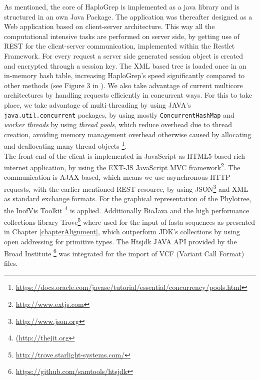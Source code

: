 As mentioned, the core of HaploGrep is implemented as a java library and is structured in an own Java Package. The application was thereafter designed as a Web application based on client-server architecture. This way all the computational intensive tasks are performed on server side, by getting use of REST for the client-server communication, implemented within the Restlet Framework. For every request a server side generated session object is created and encrypted through a session key. The XML based tree is loaded once in an in-memory hash table, increasing HaploGrep's speed significantly compared to other methods (see Figure 3 in \cite{Kloss-Brandstatter2011}). We also take advantage of current multicore architectures by handling requests efficiently in concurrent ways. For this to take place, we take advantage of multi-threading by using JAVA's \verb|java.util.concurrent| packages, by using mostly \verb|ConcurrentHashMap| and \textit{worker threads} by using \textit{thread pools}, which reduce overhead due to thread creation, avoiding memory management overhead otherwise caused by allocating and deallocating many thread objects \footnote{\url{https://docs.oracle.com/javase/tutorial/essential/concurrency/pools.html}}. \\
The front-end of the client is implemented in JavaScript as HTML5-based rich internet application, by using the EXT-JS JavaScript MVC framework\footnote{\url{http://www.extjs.com}}. The communication is AJAX based, which means we use asynchronous HTTP requests, with the earlier mentioned REST-resource, by using JSON\footnote{\url{http://www.json.org}} and XML as standard exchange formats. For the graphical representation of the Phylotree, the InofVis Toolkit \footnote{\url{(http://thejit.org}} is applied. Additionally BioJava \cite{Prlic2012} and the high performance collections library Trove\footnote{\url{http://trove.starlight-systems.com/}} where used for the input of fasta sequences as presented in Chapter \ref{chapterAlignment}, which outperform JDK's collections by using open addressing for primitive types. The Htsjdk JAVA API provided by the Broad Institute \footnote{\url{https://github.com/samtools/htsjdk}} was integrated for the import of VCF (Variant Call Format) files.

